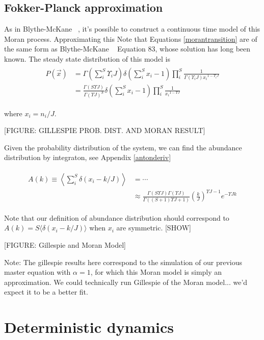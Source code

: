 \documentclass[11pt,a4paper,final]{iopart}
\begin{document}
\subsection{Fokker-Planck approximation}

As in Blythe-McKane ~\cite{ref4}, it's possible to construct a continuous time model of this Moran process.
Approximating this 
Note that Equations \ref{morantransition} are of the same form as Blythe-McKane ~\cite{ref4} Equation 83, whose solution has long been known.
The steady state distribution of this model is
\begin{align}
\begin{split}
P(\vec{x}) &= \Gamma (\sum_i^S \Upsilon_i J) \delta(\sum_i^S x_i -1) \prod_{i}^S \frac{1}{\Gamma (\Upsilon_i J){x_i}^{1-\Upsilon_i J}} \\
&= \frac{\Gamma (S \Upsilon J)}{\Gamma (\Upsilon J)^S} \delta(\sum_i^S x_i -1) \prod_{i}^S \frac{1}{{x_i}^{1-\Upsilon J}}
\end{split}
\end{align}

where $x_i=n_i/J$.

[FIGURE: GILLESPIE PROB. DIST. AND MORAN RESULT]

Given the probability distribution of the system, we can find the abundance distribution by integraton, see Appendix \ref{antonderiv}

\begin{align}
\begin{split}
A(k) \equiv \left\langle \sum_i^S \delta(x_i-k/J) \right\rangle &= \cdots \\
&\approx \frac{\Gamma (S \Upsilon J) \Gamma (\Upsilon J)}{\Gamma ((S+1)\Upsilon J + 1)}\left(\frac{k}{J}\right)^{\Upsilon J - 1} e^{-\Upsilon J k}
\end{split}
\end{align}

Note that our definition of abundance distribution should correspond to $A(k)=S\langle \delta(x_i-k/J) \rangle$ when $x_i$ are symmetric. [SHOW]

[FIGURE: Gillespie and Moran Model]

Note: The gillespie results here correspond to the simulation of our previous master equation with $\alpha = 1$, for which this Moran model is simply an approximation. We could technically run Gillespie of the Moran model... we'd expect it to be a better fit.

\section{Deterministic dynamics}
\end{document}
